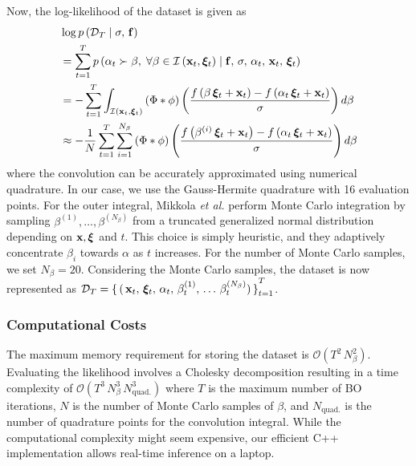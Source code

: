 Now, the log-likelihood of the dataset is given as
{\small
\begin{align}
  &\log p\left(\mathcal{D}_T \mid \sigma,\, \mathbf{f} \right) \nonumber \\
  &= \sum_{t=1}^{T} p\left(\alpha_t \succ \beta,\; \forall \beta \in \mathcal{I}\left(\mathbf{x}_t, \bm{\xi}_t\right) \mid \mathbf{f},\, \sigma,\, \alpha_t,\, \mathbf{x}_t,\, \bm{\xi}_t\right) \\
  &= -\sum_{t=1}^{T} \int_{\mathcal{I}\left(\mathbf{x}_{t}, \bm{\xi}_{t}\right)} \left(\Phi * \phi \right) \left( \frac{ f\left(\beta \, \bm{\xi}_{t} + \mathbf{x}_{t} \right) - f\left(\alpha_{t} \, \bm{\xi}_{t} + \mathbf{x}_{t} \right) }{\sigma} \right) d\beta \\
  &\approx -\frac{1}{N}  \sum_{t=1}^{T} \sum_{i=1}^{N_{\beta}} \left(\Phi * \phi \right) \left( \frac{ f\left(\beta^{(i)} \, \bm{\xi}_{t} + \mathbf{x}_{t} \right) - f\left(\alpha_{t} \, \bm{\xi}_{t} + \mathbf{x}_{t} \right) }{\sigma} \right) d\beta
\end{align}
}%
{\noindent}where the convolution can be accurately approximated using numerical quadrature.
In our case, we use the Gauss-Hermite quadrature with 16 evaluation points.
For the outer integral, Mikkola \textit{et al.} perform Monte Carlo integration by sampling \(\beta^{(1)}, \ldots, \beta^{(N_{\beta})} \) from a truncated generalized normal distribution depending on \(\mathbf{x}, \bm{\xi}\) and \(t\).
This choice is simply heuristic, and they adaptively concentrate \(\beta_i\) towards \(\alpha\) as \(t\) increases.
For the number of Monte Carlo samples, we set \(N_{\beta}=20\).
Considering the Monte Carlo samples, the dataset is now represented as \(\mathcal{D}_{T} = {\{\,(\,\mathbf{x}_{t},\, \bm{\xi}_{t},\, \alpha_{t},\, \beta^{(1)}_{t},\, \ldots\, \beta^{(N_{\beta})}_{t})\,\}}_{t=1}^{T}\).

\subsubsection{Computational Costs}
The maximum memory requirement for storing the dataset is \(\mathcal{O}\left( T^2 \, N_{\beta}^2  \right)\).
Evaluating the likelihood involves a Cholesky decomposition resulting in a time complexity of \(\mathcal{O}\left( T^3 \, N_{\beta}^3 \, N_{\text{quad.}}^3  \right)\) where \(T\) is the maximum number of BO iterations, \(N\) is the number of Monte Carlo samples of \(\beta\), and \(N_{\text{quad.}}\) is the number of quadrature points for the convolution integral.
While the computational complexity might seem expensive, our efficient C++ implementation allows real-time inference on a laptop.

